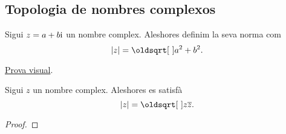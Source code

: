 \documentclass[../../Main.tex]{subfiles}
\begin{document}
	\subsection{Topologia de nombres complexos}
	\begin{definition}
		\label{def:norma d'un nombre complex}
		Sigui \(z=a+b\mathrm{i}\) un nombre complex. Aleshores definim la seva norma com
		\[\norma{z}=\sqrt{a^{2}+b^{2}}.\]
	\end{definition}
	\begin{proposition}
		\href{http://chistemat.es/wp-content/uploads/2013/11/contra-la-desigualdad.png}{Prova visual}.
	\end{proposition}
	\begin{proposition}
		\label{prop:la nomra d'un nombre complex és l'arrel del nombre pel seu conjugat}
		Sigui \(z\) un nombre complex. Aleshores es satisfà
		\[\norma{z}=\sqrt{z\conjugat{z}}.\]
		\begin{proof}
		\end{proof}
	\end{proposition}
	
\end{document}
